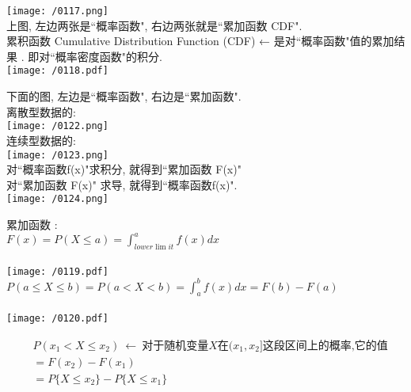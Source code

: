 \documentclass[UTF8]{ctexart}
\begin{document}
\texttt{[image: /0117.png]} \\

上图, 左边两张是``概率函数", 右边两张就是``累加函数 CDF". \\


累积函数 Cumulative Distribution Function (CDF) ← 是对``概率函数"值的累加结果 . 即对``概率密度函数"的积分.  \\

\texttt{[image: /0118.pdf]} \\


\begin{myEnvSample}
下面的图, 左边是``概率函数", 右边是``累加函数". \\

离散型数据的: \\
\texttt{[image: /0122.png]} \\

连续型数据的: \\
\texttt{[image: /0123.png]} \\


对``概率函数f(x)"求积分, 就得到``累加函数 F(x)" \\
对``累加函数 F(x)" 求导, 就得到``概率函数f(x)". \\

\texttt{[image: /0124.png]}
\end{myEnvSample}




	累加函数 : \\
	$ \boxed{
	F(x)=P(X\leq a)=\int_{lower\lim it}^a{f\left( x \right) dx}	}$ \\
	\\
	\texttt{[image: /0119.pdf]} \\
	
	
	$ \boxed{
	P(a\leq X\leq b)=P(a<X<b)=\int_a^b{f\left( x \right) dx}=F\left( b \right) -F\left( a \right) 	} $ \\
\\
	\texttt{[image: /0120.pdf]} 
	
	
	\begin{align*}  %
	& P(x_1<X\leq x_2)\ ←\ \text{对于随机变量}X\text{在}(x_1,x_2]\text{这段区间上的概率,它的值}\\
& =F(x_2)-F(x_1)\\
& =P\{X\leq x_2\}-P\{X\leq x_1\}
	\end{align*}
\end{document}
